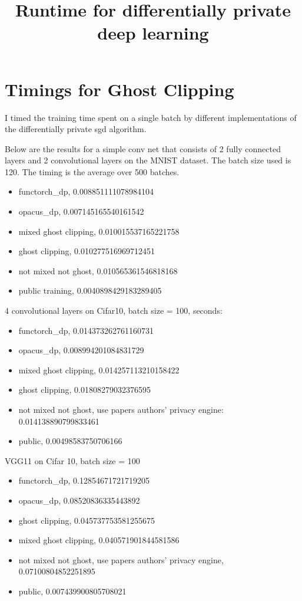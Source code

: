 \documentclass{article}
\date{}
\author{}
\title{Runtime for differentially private deep learning}
\theoremstyle{plain}
\begin{document}
\maketitle
    
\doublespacing
\section*{Timings for Ghost Clipping}
I timed the training time spent on a single batch by different implementations of the differentially private sgd algorithm.

Below are the results for a simple conv net that consists of 2 fully connected layers and 2 convolutional layers on the MNIST dataset. The batch size used is 120. The timing is the average over 500 batches.
\begin{itemize}
    \item functorch\_dp, 0.008851111078984104
    \item opacus\_dp, 0.007145165540161542
    \item mixed ghost clipping, 0.010015537165221758
    \item ghost clipping, 0.010277516969712451
    \item not mixed not ghost, 0.010565361546818168
    \item public training, 0.0040898429183289405
\end{itemize}

4 convolutional layers on Cifar10, batch size = 100, seconds:
\begin{itemize}
    \item functorch\_dp, 0.014373262761160731
    \item opacus\_dp, 0.008994201084831729
    \item mixed ghost clipping, 0.014257113210158422
    \item ghost clipping, 0.01808279032376595
    \item not mixed not ghost, use papers authors' privacy engine:  0.014138890799833461
    \item public, 0.00498583750706166
\end{itemize}

VGG11 on Cifar 10, batch size = 100
\begin{itemize}
    \item functorch\_dp, 0.12854671721719205
    \item opacus\_dp, 0.08520836335443892
    \item ghost clipping, 0.045737753581255675
    \item mixed ghost clipping, 0.040571901844581586
    \item not mixed not ghost, use papers authors' privacy engine, 0.07100804852251895
    \item public, 0.007439900805708021
\end{itemize}
\end{document}
